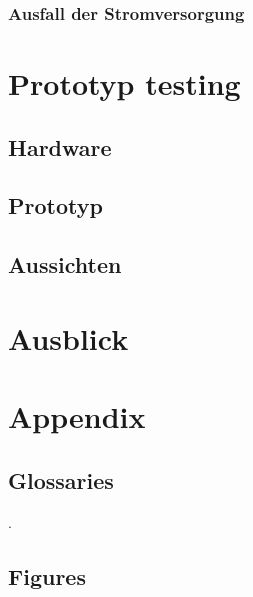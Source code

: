 \documentclass[12pt]{article}
\begin{document}
\subsubsection{Ausfall der Stromversorgung}
%

\newpage %
\section{Prototyp testing}
\subsection{Hardware}
\subsection{Prototyp}
\subsection{Aussichten}
%

\newpage %
\section{Ausblick}
%

\newpage %
\cfoot{}
\section{Appendix}
\label{sec:appenix}

\subsection{Glossaries}
\label{subsec:glossaries}
\begingroup
\renewcommand{\section}[2]{}
\printglossary[style=tree]
\endgroup
\newpage

{\small\color{white}.}
\vspace{-2cm}
\subsection{Figures}
\label{subsec:figures}
\begingroup
\renewcommand{\section}[2]{}
\listoffigures
\endgroup
\end{document}
